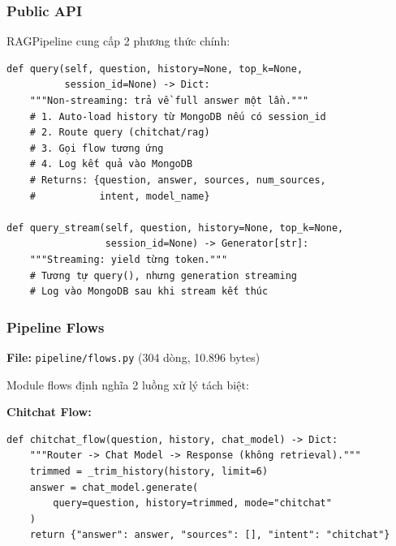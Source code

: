 \documentclass[../DoAn.tex]{subfiles}
\begin{document}
\subsubsection{Public API}
RAGPipeline cung cấp 2 phương thức chính:
\begin{verbatim}
def query(self, question, history=None, top_k=None,
          session_id=None) -> Dict:
    """Non-streaming: trả về full answer một lần."""
    # 1. Auto-load history từ MongoDB nếu có session_id
    # 2. Route query (chitchat/rag)
    # 3. Gọi flow tương ứng
    # 4. Log kết quả vào MongoDB
    # Returns: {question, answer, sources, num_sources,
    #           intent, model_name}

def query_stream(self, question, history=None, top_k=None,
                 session_id=None) -> Generator[str]:
    """Streaming: yield từng token."""
    # Tương tự query(), nhưng generation streaming
    # Log vào MongoDB sau khi stream kết thúc
\end{verbatim}

\subsubsection{Pipeline Flows}
\textbf{File:} \texttt{pipeline/flows.py} (304 dòng, 10.896 bytes)

Module flows định nghĩa 2 luồng xử lý tách biệt:

\textbf{Chitchat Flow:}
\begin{verbatim}
def chitchat_flow(question, history, chat_model) -> Dict:
    """Router -> Chat Model -> Response (không retrieval)."""
    trimmed = _trim_history(history, limit=6)
    answer = chat_model.generate(
        query=question, history=trimmed, mode="chitchat"
    )
    return {"answer": answer, "sources": [], "intent": "chitchat"}
\end{verbatim}
\end{document}
